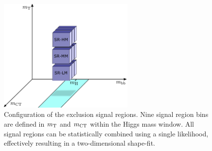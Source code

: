 \FloatBarrier
\newpage


\begin{figure}
	\centering\includegraphics[width=0.6\textwidth]{strategy_2}
	\caption{Configuration of the exclusion signal regions. Nine signal region bins are defined in $m_{\textrm{T}}$ and $m_{\textrm{CT}}$ within the Higgs mass window. All signal regions can be statistically combined using a single likelihood, effectively resulting in a two-dimensional shape-fit.}\label{fig:sr_strategy}
\end{figure}

